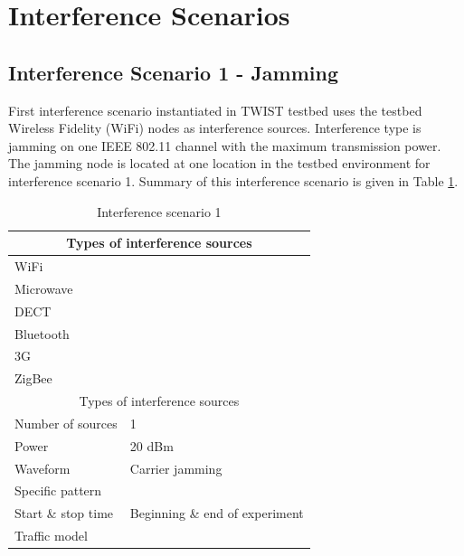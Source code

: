 \documentclass[11pt,a4paper,headinclude,footinclude,chapterprefix=on]{scrreprt}
\begin{document}
\section{Interference Scenarios}\label{sec:interference} 
\subsection{Interference Scenario 1 - Jamming}\label{scene:int:1} First interference scenario instantiated in TWIST testbed uses the testbed Wireless Fidelity (WiFi) nodes as interference sources. Interference type is jamming on one IEEE 802.11 channel with the maximum transmission power. The jamming node is located at one location in the testbed environment for interference scenario 1. Summary of this interference scenario is given in Table \ref{tb:interf:1}. 
\begin{table}
	[h] \centering \caption{Interference scenario 1} \label{tb:interf:1} 
	\begin{tabular}
		{|l|l|} \hline \multicolumn{2}{|c|}{Types of interference sources} \\
		\hline WiFi & \checkmark \\
		Microwave & \texttimes \\
		DECT & \texttimes \\
		Bluetooth & \texttimes \\
		3G & \texttimes \\
		ZigBee & \texttimes \\
		\hline \multicolumn{2}{|c|}{Types of interference sources} \\
		\hline Number of sources & 1 \\
		Power & 20 dBm \\
		Waveform & Carrier jamming \\
		Specific pattern & \\
		Start \& stop time & Beginning \& end of experiment \\
		Traffic model & \\
		\hline 
	\end{tabular}
\end{table}
\end{document}
